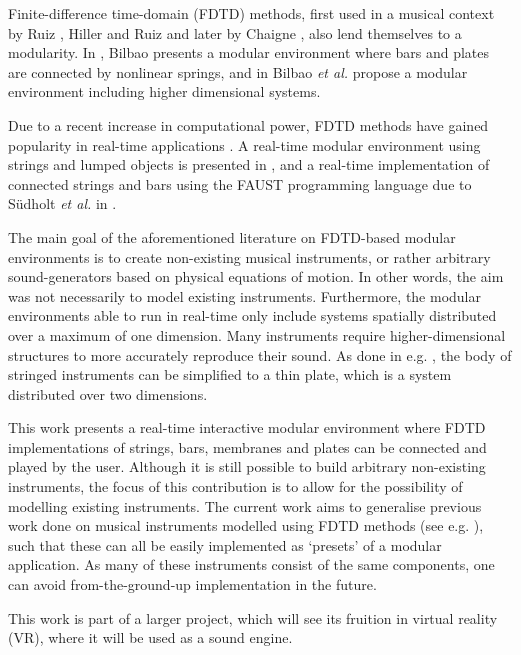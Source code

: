 \documentclass{article}
\begin{document}
Finite-difference time-domain (FDTD) methods, first used in a musical context by Ruiz \cite{Ruiz1969}, Hiller and Ruiz \cite{Hiller1971I, Hiller1971II} and later by Chaigne \cite{Chaigne1992}, also lend themselves to a modularity. In \cite{Bilbao2009Modular}, Bilbao presents a modular environment where bars and plates are connected by nonlinear springs, and in \cite{Bilbao2014} Bilbao \textit{et al.} propose a modular environment including higher dimensional systems.

Due to a recent increase in computational power, FDTD methods have gained popularity in real-time applications \cite{WillemsenThesis}. A real-time modular environment using strings and lumped objects is presented in \cite{Bilbao2019}, and a real-time implementation of connected strings and bars using the FAUST programming language due to S\"udholt \textit{et al.} in \cite{Sudholt2021}. 

The main goal of the aforementioned literature on FDTD-based modular environments is to create non-existing musical instruments, or rather arbitrary sound-generators based on physical equations of motion. In other words, the aim was not necessarily to model existing instruments. Furthermore, the modular environments able to run in real-time only include systems spatially distributed over a maximum of one dimension. Many instruments require higher-dimensional structures to more accurately reproduce their sound. As done in e.g. \cite{Willemsen2019, Willemsen2020}, the body of stringed instruments can be simplified to a thin plate, which is a system distributed over two dimensions. 

This work presents a real-time interactive modular environment where FDTD implementations of strings, bars, membranes and plates can be connected and played by the user. Although it is still possible to build arbitrary non-existing instruments, the focus of this contribution is to allow for the possibility of modelling existing instruments. The current work aims to generalise previous work done on musical instruments modelled using FDTD methods (see e.g. \cite{Willemsen2019, Willemsen2020, Lasickas2021, Sudholt2021Langeleik, Mosen2021}), such that these can all be easily implemented as `presets' of a modular application. As many of these instruments consist of the same components, one can avoid from-the-ground-up implementation in the future. 

This work is part of a larger project, which will see its fruition in virtual reality (VR), where it will be used as a sound engine.
\end{document}

